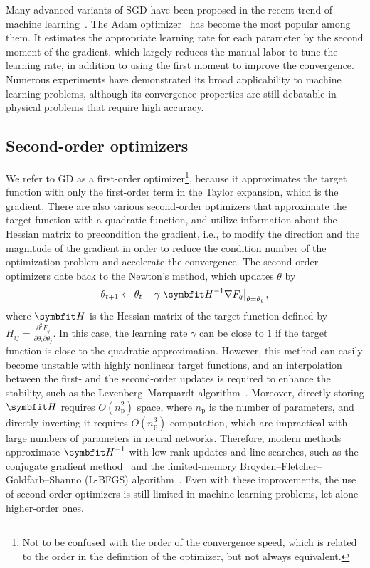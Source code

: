 Many advanced variants of SGD have been proposed in the recent trend of machine learning~\cite{kashyap2022survey}. The Adam optimizer~\cite{kingma2014adam} has become the most popular among them. It estimates the appropriate learning rate for each parameter by the second moment of the gradient, which largely reduces the manual labor to tune the learning rate, in addition to using the first moment to improve the convergence. Numerous experiments have demonstrated its broad applicability to machine learning problems, although its convergence properties are still debatable in physical problems that require high accuracy.

\subsection{Second-order optimizers}

We refer to GD as a first-order optimizer\footnote{Not to be confused with the order of the convergence speed, which is related to the order in the definition of the optimizer, but not always equivalent.}, because it approximates the target function with only the first-order term in the Taylor expansion, which is the gradient. There are also various second-order optimizers that approximate the target function with a quadratic function, and utilize information about the Hessian matrix to precondition the gradient, i.e., to modify the direction and the magnitude of the gradient in order to reduce the condition number of the optimization problem and accelerate the convergence. The second-order optimizers date back to the Newton's method, which updates $\theta$ by
\begin{equation}
\theta_{t + 1} \gets \theta_t - \gamma \left. \mH^{-1} \nabla F_q \right|_{\theta = \theta_t},
\label{eq:newton}
\end{equation}
where $\mH$ is the Hessian matrix of the target function defined by $H_{i j} = \frac{\partial^2 F_q}{\partial \theta_i \partial \theta_j}$. In this case, the learning rate $\gamma$ can be close to $1$ if the target function is close to the quadratic approximation. However, this method can easily become unstable with highly nonlinear target functions, and an interpolation between the first- and the second-order updates is required to enhance the stability, such as the Levenberg--Marquardt algorithm~\cite{levenberg1944method}. Moreover, directly storing $\mH$ requires $O(n_\text{p}^2)$ space, where $n_\text{p}$ is the number of parameters, and directly inverting it requires $O(n_\text{p}^3)$ computation, which are impractical with large numbers of parameters in neural networks. Therefore, modern methods approximate $\mH^{-1}$ with low-rank updates and line searches, such as the conjugate gradient method~\cite{fletcher1964function} and the limited-memory Broyden--Fletcher--Goldfarb--Shanno (L-BFGS) algorithm~\cite{liu1989limited}. Even with these improvements, the use of second-order optimizers is still limited in machine learning problems, let alone higher-order ones.

